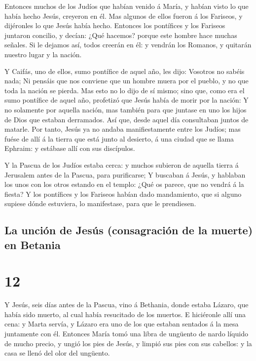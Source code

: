  Entonces muchos de los Judíos que habían venido á María,
y habían visto lo que había hecho Jesús, creyeron en él. 
Mas algunos de ellos fueron á los Fariseos, y dijéronles lo que Jesús
había hecho.  Entonces los pontífices y los Fariseos
juntaron concilio, y decían: ¿Qué hacemos? porque este hombre hace
muchas señales.  Si le dejamos así, todos creerán en él:
y vendrán los Romanos, y quitarán nuestro lugar y la nación.

 Y Caifás, uno de ellos, sumo pontífice de aquel año, les
dijo: Vosotros no sabéis nada;  Ni pensáis que nos
conviene que un hombre muera por el pueblo, y no que toda la nación se
pierda.  Mas esto no lo dijo de sí mismo; sino que, como
era el sumo pontífice de aquel año, profetizó que Jesús había de morir
por la nación:  Y no solamente por aquella nación, mas
también para que juntase en uno los hijos de Dios que estaban
derramados.  Así que, desde aquel día consultaban juntos
de matarle.  Por tanto, Jesús ya no andaba
manifiestamente entre los Judíos; mas fuése de allí á la tierra que está
junto al desierto, á una ciudad que se llama Ephraim: y estábase allí
con sus discípulos.

 Y la Pascua de los Judíos estaba cerca: y muchos
subieron de aquella tierra á Jerusalem antes de la Pascua, para
purificarse;  Y buscaban á Jesús, y hablaban los unos con
los otros estando en el templo: ¿Qué os parece, que no vendrá á la
fiesta?  Y los pontífices y los Fariseos habían dado
mandamiento, que si alguno supiese dónde estuviera, lo manifestase, para
que le prendiesen.

\hypertarget{la-unciuxf3n-de-jesuxfas-consagraciuxf3n-de-la-muerte-en-betania}{%
\subsection{La unción de Jesús (consagración de la muerte) en
Betania}\label{la-unciuxf3n-de-jesuxfas-consagraciuxf3n-de-la-muerte-en-betania}}

\hypertarget{section-43-12}{%
\section{12}\label{section-43-12}}

 Y Jesús, seis días antes de la Pascua, vino á Bethania,
donde estaba Lázaro, que había sido muerto, al cual había resucitado de
los muertos.  E hiciéronle allí una cena: y Marta servía,
y Lázaro era uno de los que estaban sentados á la mesa juntamente con
él.  Entonces María tomó una libra de ungüento de nardo
líquido de mucho precio, y ungió los pies de Jesús, y limpió sus pies
con sus cabellos: y la casa se llenó del olor del ungüento.

